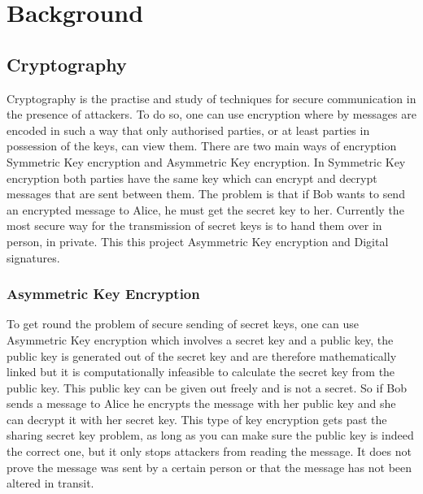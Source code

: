 
\chapter{Background}
\label{back}

\section{Cryptography}

Cryptography is the practise and study of techniques for secure communication in the presence of attackers. To do so, one can use encryption where by messages are encoded in such a way that only authorised parties, or at least parties in possession of the keys, can view them. There are two main ways of encryption Symmetric Key encryption and Asymmetric Key encryption. In Symmetric Key encryption both parties have the same key which can encrypt and decrypt messages that are sent between them. The problem is that if Bob wants to send an encrypted message to Alice, he must get the secret key to her. Currently the most secure way for the transmission of secret keys is to hand them over in person, in private. This this project Asymmetric Key encryption and Digital signatures.


\subsection{Asymmetric Key Encryption}

To get round the problem of secure sending of secret keys, one can use Asymmetric Key encryption which involves a secret key and a public key, the public key is generated out of the secret key and are therefore mathematically linked but it is computationally infeasible to calculate the secret key from the public key. This public key can be given out freely and is not a secret. So if Bob sends a message to Alice he encrypts the message with her public key and she can decrypt it with her secret key. This type of key encryption gets past the sharing secret key problem, as long as you can make sure the public key is indeed the correct one, but it only stops attackers from reading the message. It does not prove the message was sent by a certain person or that the message has not been altered in transit.

